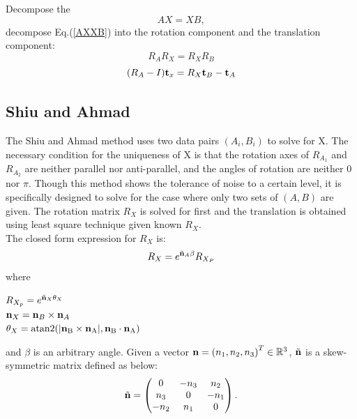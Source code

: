 \documentclass[twocolumn,10pt]{asme2ej}
\newcommand{\nn}{{\bf n}}
\newcommand{\ttt}{{\bf t}}
\begin{document}
Decompose the 
\begin{equation}
AX = XB,
\label{AXXB}
\end{equation}
decompose Eq.(\ref{AXXB}) into the rotation component and the translation component: 
\begin{equation}
R_{A}R_{X} = R_{X}R_{B}
\label{Rotation}
\end{equation}
\begin{equation}
(R_{A} - I)\ttt_{x} = R_{X}\ttt_{B} - \ttt_{A}
\label{Translation}
\end{equation}

\subsection{Shiu and Ahmad }
The Shiu and Ahmad method\cite{shiu1989calibration} uses two data pairs $(A_{i}, B_{i})$ to solve for X. The necessary condition for the uniqueness of X is that the rotation axes of $R_{A_1}$ and $R_{A_2}$ are neither parallel nor anti-parallel, and the angles of rotation are neither 0 nor $\pi$. Though this method shows the tolerance of noise to a certain level, it is specifically designed to solve for the case where only two sets of $(A, B)$ are given. 
The rotation matrix $R_{X}$ is solved for first and the translation is obtained using least square technique given known $R_{X}$.\\

The closed form expression for $R_{X}$ is:
\begin{equation}
R_{X} = e^{\tilde{\nn}_{A}\beta}R_{X_{P}}
\label{RotationCheng}
\end{equation}
where 
\begin{center}
$R_{X_{p}} =  e^{\tilde{\nn}_{X}\theta_{X}}$\\
$\nn_{X} = \nn_{B} \times \nn_{A}$\\
$\theta_{X} = \rm atan2(|\nn_{B} \times \nn_{A}|,\nn_{B} \cdot \nn_{A})$\\
\end{center}
and $\beta$ is an arbitrary angle. Given a vector $\nn = \left( n_{1}, n_{2}, n_{3} \right)^{T} \in \mathbb{R}^{3}$, $\tilde{\nn}$ is a skew-symmetric matrix defined as below:\\
\begin{equation}
\tilde{\nn}
=
\begin{pmatrix}
0 & -n_{3} & n_{2} \\
n_{3} & 0 & -n_{1} \\
-n_{2} & n_{1} & 0
\end{pmatrix}.
\end{equation}
\end{document}
